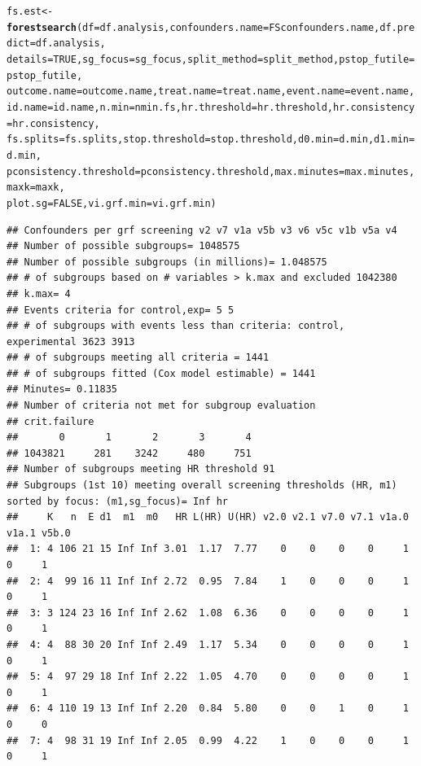 \documentclass[9pt]{article}\usepackage[]{graphicx}\usepackage[]{xcolor}
\makeatletter
\newcommand{\hlnum}[1]{\textcolor[rgb]{0.686,0.059,0.569}{#1}}%
\newcommand{\hlstd}[1]{\textcolor[rgb]{0.345,0.345,0.345}{#1}}%
\newcommand{\hlkwb}[1]{\textcolor[rgb]{0.69,0.353,0.396}{#1}}%
\newcommand{\hlkwc}[1]{\textcolor[rgb]{0.333,0.667,0.333}{#1}}%
\newcommand{\hlkwd}[1]{\textcolor[rgb]{0.737,0.353,0.396}{\textbf{#1}}}%
\newenvironment{kframe}{%
 \def\at@end@of@kframe{}%
 \ifinner\ifhmode%
  \def\at@end@of@kframe{\end{minipage}}%
  \begin{minipage}{\columnwidth}%
 \fi\fi%
 \def\FrameCommand##1{\hskip\@totalleftmargin \hskip-\fboxsep
 \colorbox{shadecolor}{##1}\hskip-\fboxsep
     \hskip-\linewidth \hskip-\@totalleftmargin \hskip\columnwidth}%
 \MakeFramed {\advance\hsize-\width
   \@totalleftmargin\z@ \linewidth\hsize
   \@setminipage}}%
 {\par\unskip\endMakeFramed%
 \at@end@of@kframe}
\newenvironment{knitrout}{}{} %
\theoremstyle{definition}
\theoremstyle{remark}
\makeatother
\begin{document}
\begin{knitrout}
\begin{kframe}
\begin{alltt}
\hlstd{fs.est} \hlkwb{<-} \hlkwd{forestsearch}\hlstd{(}\hlkwc{df} \hlstd{= df.analysis,} \hlkwc{confounders.name} \hlstd{= FSconfounders.name,} \hlkwc{df.predict} \hlstd{= df.analysis,}
    \hlkwc{details} \hlstd{=} \hlnum{TRUE}\hlstd{,} \hlkwc{sg_focus} \hlstd{= sg_focus,} \hlkwc{split_method} \hlstd{= split_method,} \hlkwc{pstop_futile} \hlstd{= pstop_futile,}
    \hlkwc{outcome.name} \hlstd{= outcome.name,} \hlkwc{treat.name} \hlstd{= treat.name,} \hlkwc{event.name} \hlstd{= event.name,}
    \hlkwc{id.name} \hlstd{= id.name,} \hlkwc{n.min} \hlstd{= nmin.fs,} \hlkwc{hr.threshold} \hlstd{= hr.threshold,} \hlkwc{hr.consistency} \hlstd{= hr.consistency,}
    \hlkwc{fs.splits} \hlstd{= fs.splits,} \hlkwc{stop.threshold} \hlstd{= stop.threshold,} \hlkwc{d0.min} \hlstd{= d.min,} \hlkwc{d1.min} \hlstd{= d.min,}
    \hlkwc{pconsistency.threshold} \hlstd{= pconsistency.threshold,} \hlkwc{max.minutes} \hlstd{= max.minutes,} \hlkwc{maxk} \hlstd{= maxk,}
    \hlkwc{plot.sg} \hlstd{=} \hlnum{FALSE}\hlstd{,} \hlkwc{vi.grf.min} \hlstd{= vi.grf.min)}
\end{alltt}
\begin{verbatim}
## Confounders per grf screening v2 v7 v1a v5b v3 v6 v5c v1b v5a v4 
## Number of possible subgroups= 1048575 
## Number of possible subgroups (in millions)= 1.048575 
## # of subgroups based on # variables > k.max and excluded 1042380 
## k.max= 4 
## Events criteria for control,exp= 5 5 
## # of subgroups with events less than criteria: control, experimental 3623 3913 
## # of subgroups meeting all criteria = 1441 
## # of subgroups fitted (Cox model estimable) = 1441 
## Minutes= 0.11835 
## Number of criteria not met for subgroup evaluation 
## crit.failure
##       0       1       2       3       4 
## 1043821     281    3242     480     751 
## Number of subgroups meeting HR threshold 91 
## Subgroups (1st 10) meeting overall screening thresholds (HR, m1) sorted by focus: (m1,sg_focus)= Inf hr 
##     K   n  E d1  m1  m0   HR L(HR) U(HR) v2.0 v2.1 v7.0 v7.1 v1a.0 v1a.1 v5b.0
##  1: 4 106 21 15 Inf Inf 3.01  1.17  7.77    0    0    0    0     1     0     1
##  2: 4  99 16 11 Inf Inf 2.72  0.95  7.84    1    0    0    0     1     0     1
##  3: 3 124 23 16 Inf Inf 2.62  1.08  6.36    0    0    0    0     1     0     1
##  4: 4  88 30 20 Inf Inf 2.49  1.17  5.34    0    0    0    0     1     0     1
##  5: 4  97 29 18 Inf Inf 2.22  1.05  4.70    0    0    0    0     1     0     1
##  6: 4 110 19 13 Inf Inf 2.20  0.84  5.80    0    0    1    0     1     0     0
##  7: 4  98 31 19 Inf Inf 2.05  0.99  4.22    1    0    0    0     1     0     1

\end{verbatim}
\end{kframe}
\end{knitrout}
\end{document}
